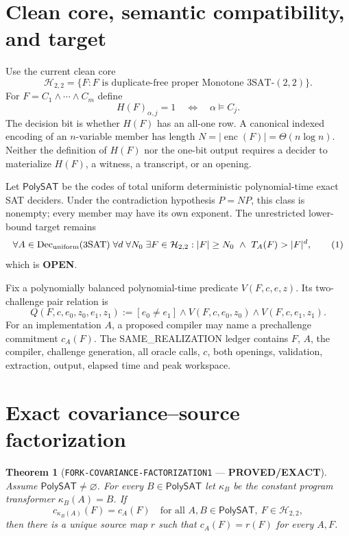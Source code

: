 \documentclass[11pt]{article}
\newcommand{\EXACT}{\textbf{PROVED/EXACT}}
\newcommand{\OPEN}{\textbf{OPEN}}
\newtheorem{theorem}{Theorem}
\begin{document}
\section{Clean core, semantic compatibility, and target}

Use the current clean core
\[
 \mathcal H_{2,2}=\{F:F\text{ is duplicate-free proper Monotone }
 3\mathrm{SAT}\text{-}(2,2)\}.
\]
For $F=C_1\wedge\cdots\wedge C_m$ define
\[
 H(F)_{\alpha,j}=1\quad\Longleftrightarrow\quad \alpha\models C_j.
\]
The decision bit is whether $H(F)$ has an all-one row.  A canonical indexed
encoding of an $n$-variable member has length
$N=|\operatorname{enc}(F)|=\Theta(n\log n)$.  Neither the definition of
$H(F)$ nor the one-bit output requires a decider to materialize $H(F)$, a
witness, a transcript, or an opening.

Let $\mathsf{PolySAT}$ be the codes of total uniform deterministic
polynomial-time exact SAT deciders.  Under the contradiction hypothesis
$P=NP$, this class is nonempty; every member may have its own exponent.  The
unrestricted lower-bound target remains
\[
 \forall A\in\operatorname{Dec}_{\rm uniform}(3\mathrm{SAT})\;
 \forall d\;\forall N_0\;\exists F\in\mathcal H_{2,2}:
 |F|\ge N_0\ \wedge\ T_A(F)>|F|^d,                       \tag{1}
\]
which is \OPEN.

Fix a polynomially balanced polynomial-time predicate
$V(F,c,e,z)$.  Its two-challenge pair relation is
\[
 Q(F,c,e_0,z_0,e_1,z_1):=[e_0\ne e_1]\wedge
 V(F,c,e_0,z_0)\wedge V(F,c,e_1,z_1).                    \tag{2}
\]
For an implementation $A$, a proposed compiler may name a prechallenge
commitment $c_A(F)$.  The SAME\_REALIZATION ledger contains $F$, $A$, the
compiler, challenge generation, all oracle calls, $c$, both openings,
validation, extraction, output, elapsed time and peak workspace.

\section{Exact covariance--source factorization}

\begin{theorem}[\texttt{FORK-COVARIANCE-FACTORIZATION1} --- \EXACT]
Assume $\mathsf{PolySAT}\ne\varnothing$.  For every
$B\in\mathsf{PolySAT}$ let $\kappa_B$ be the constant program transformer
$\kappa_B(A)=B$.  If
\[
 c_{\kappa_B(A)}(F)=c_A(F)
 \quad\text{for all }A,B\in\mathsf{PolySAT},\ F\in\mathcal H_{2,2}, \tag{3}
\]
then there is a unique source map $r$ such that
$c_A(F)=r(F)$ for every $A,F$.
\end{theorem}
\end{document}
